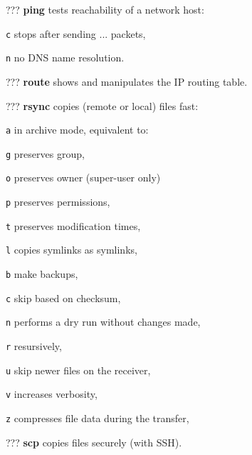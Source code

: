 \begin{compactenum}
\item [???] \textbf{ping} tests reachability of a network host:
\item [\texttt{c}] stops after sending ... packets,
\item [\texttt{n}] no DNS name resolution.
\item [???] \textbf{route} shows and manipulates the IP routing table.
\end{compactenum}

\begin{compactenum}
\item [???] \textbf{rsync} copies (remote or local) files fast:
\item [\texttt{a}] in archive mode, equivalent to:
\item [\texttt{g}] preserves group,
\item [\texttt{o}] preserves owner (super-user only)
\item [\texttt{p}] preserves permissions,
\item [\texttt{t}] preserves modification times,
\item [\texttt{l}] copies symlinks as symlinks,
\item [\texttt{b}] make backups, 
\item [\texttt{c}] skip based on checksum, 
\item [\texttt{n}] performs a dry run without changes made, 
\item [\texttt{r}] resursively,  %
\item [\texttt{u}] skip newer files on the receiver, 
\item [\texttt{v}] increases verbosity, %
\item [\texttt{z}] compresses file data during the transfer, %
\item [???] \textbf{scp} copies files securely (with SSH).
\end{compactenum}
